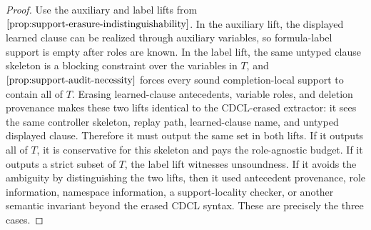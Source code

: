 \documentclass[11pt]{article}
\theoremstyle{definition}
\begin{document}
\begin{proof}
Use the auxiliary and label lifts from \(\Cref{prop:support-erasure-indistinguishability}\).  In the auxiliary lift, the displayed learned clause can be realized through auxiliary variables, so formula-label support is empty after roles are known.  In the label lift, the same untyped clause skeleton is a blocking constraint over the variables in \(T\), and \(\Cref{prop:support-audit-necessity}\) forces every sound completion-local support to contain all of \(T\).  Erasing learned-clause antecedents, variable roles, and deletion provenance makes these two lifts identical to the CDCL-erased extractor: it sees the same controller skeleton, replay path, learned-clause name, and untyped displayed clause.  Therefore it must output the same set in both lifts.  If it outputs all of \(T\), it is conservative for this skeleton and pays the role-agnostic budget.  If it outputs a strict subset of \(T\), the label lift witnesses unsoundness.  If it avoids the ambiguity by distinguishing the two lifts, then it used antecedent provenance, role information, namespace information, a support-locality checker, or another semantic invariant beyond the erased CDCL syntax.  These are precisely the three cases.
\end{proof}
\end{document}

